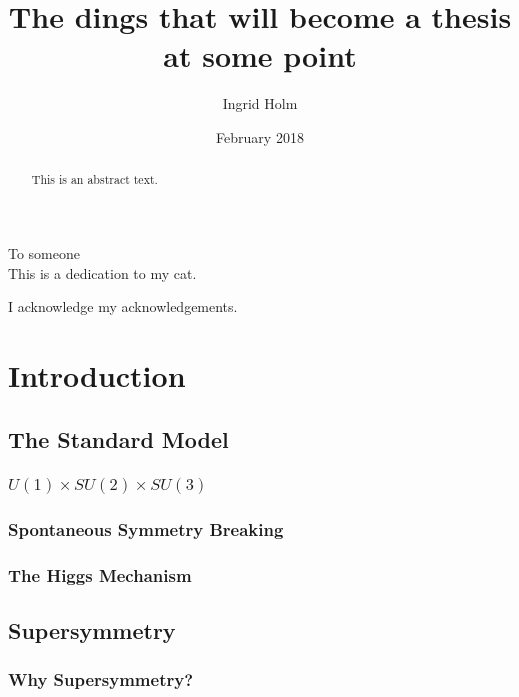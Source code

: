 \documentclass[twoside,english]{uiofysmaster}
\begin{document}
\title{The dings that will become a thesis at some point}
\author{Ingrid Holm}
\date{February 2018}

\maketitle

\begin{abstract}
This is an abstract text.
\end{abstract}

\begin{dedication}
  To someone
  \\\vspace{12pt}
  This is a dedication to my cat.
\end{dedication}

\begin{acknowledgements}
  I acknowledge my acknowledgements.
\end{acknowledgements}

\tableofcontents


\chapter{Introduction}

\section{The Standard Model}

\subsection{$U(1) \times SU(2) \times SU(3)$}

\subsection{Spontaneous Symmetry Breaking}

\subsection{The Higgs Mechanism}

\section{Supersymmetry}

\subsection{Why Supersymmetry?}
\end{document}
